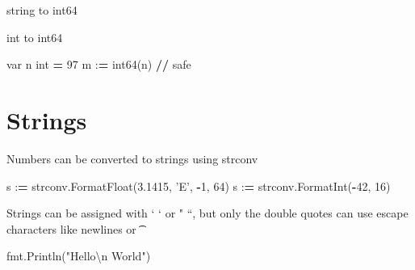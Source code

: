 \documentclass[]{book}
\newenvironment{Shaded}{\begin{snugshade}}{\end{snugshade}}
\newcommand{\DecValTok}[1]{\textcolor[rgb]{0.00,0.00,0.81}{#1}}
\newcommand{\FloatTok}[1]{\textcolor[rgb]{0.00,0.00,0.81}{#1}}
\newcommand{\CharTok}[1]{\textcolor[rgb]{0.31,0.60,0.02}{#1}}
\newcommand{\SpecialCharTok}[1]{\textcolor[rgb]{0.00,0.00,0.00}{#1}}
\newcommand{\StringTok}[1]{\textcolor[rgb]{0.31,0.60,0.02}{#1}}
\newcommand{\ControlFlowTok}[1]{\textcolor[rgb]{0.13,0.29,0.53}{\textbf{#1}}}
\newcommand{\OperatorTok}[1]{\textcolor[rgb]{0.81,0.36,0.00}{\textbf{#1}}}
\newcommand{\BuiltInTok}[1]{#1}
\newcommand{\NormalTok}[1]{#1}
\begin{document}
string to int64

\begin{Shaded}
\end{Shaded}

int to int64

\begin{Shaded}
\begin{Highlighting}[]
\NormalTok{var n }\BuiltInTok{int} \OperatorTok{=} \DecValTok{97}
\NormalTok{m :}\OperatorTok{=}\NormalTok{ int64(n) }\OperatorTok{//}\NormalTok{ safe}
\end{Highlighting}
\end{Shaded}

\section{Strings}\label{strings}

Numbers can be converted to strings using strconv

\begin{Shaded}
\begin{Highlighting}[]
\NormalTok{s :}\OperatorTok{=}\NormalTok{ strconv.FormatFloat(}\FloatTok{3.1415}\NormalTok{, }\StringTok{'E'}\NormalTok{, }\OperatorTok{-}\DecValTok{1}\NormalTok{, }\DecValTok{64}\NormalTok{)}
\NormalTok{s :}\OperatorTok{=}\NormalTok{ strconv.FormatInt(}\OperatorTok{-}\DecValTok{42}\NormalTok{, }\DecValTok{16}\NormalTok{)}
\end{Highlighting}
\end{Shaded}

Strings can be assigned with ` ` or " ``, but only the double quotes can
use escape characters like newlines \n or \t

\begin{Shaded}
\begin{Highlighting}[]
\NormalTok{fmt.Println(}\StringTok{"Hello}\CharTok{\textbackslash{}n}\StringTok{ World"}\NormalTok{)}
\end{Highlighting}
\end{Shaded}
\end{document}
